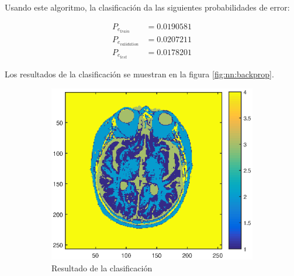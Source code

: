 \documentclass[11pt]{article} %
\begin{document}
Usando este algoritmo, la clasificación da las siguientes probabilidades de error:

\begin{align}
P_{e_{train}} &= 0.0190581 \\
P_{e_{validation}} &= 0.0207211 \\
P_{e_{test}} &= 0.0178201
\end{align}

Los resultados de la clasificación se muestran en la figura \ref{fig:nn:backprop}.

\begin{figure}%
	\centering
	\begin{subfigure}[b]{0.435\textwidth}
		\includegraphics[width=\textwidth]{../2_NN/class_backprop_100000.eps}
		\caption[]{\small Resultado de la clasificación}
		\label{fig:nn:backprop:class}
	\end{subfigure}
	\quad
	\begin{subfigure}[b]{0.435\textwidth}

\end{subfigure}
\end{figure}
\end{document}
